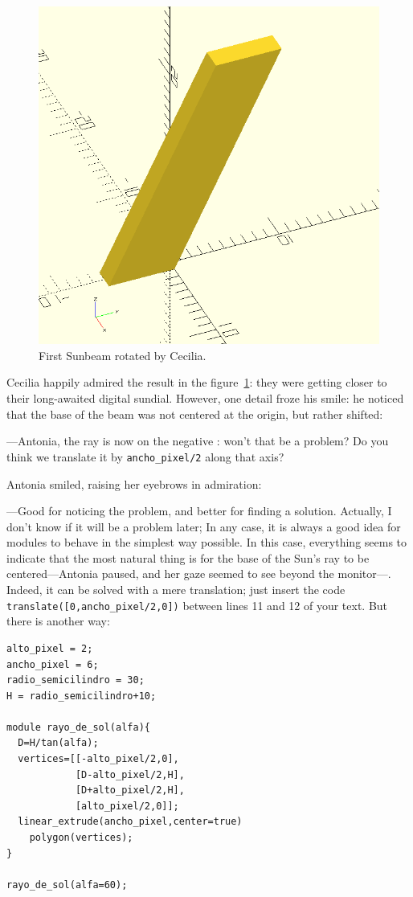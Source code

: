   \begin{figure}[t]
    \centering
  \includegraphics[width=.48\textwidth]{imagenes/rayo-extrudido-2}    
    \caption{First Sunbeam rotated by Cecilia.}
    \label{fig:rayo-extrudido-2}
  \end{figure}

Cecilia happily admired the result in the figure~\ref{fig:rayo-extrudido-2}: they were getting closer to their long-awaited digital sundial. However, one detail froze his smile: he noticed that the base of the beam was not centered at the origin, but rather shifted:

---Antonia, the ray is now on the negative  : won't that be a problem? Do you think we translate it by   \texttt{ancho\_pixel/2} along that axis?

Antonia smiled, raising her eyebrows in admiration:

---Good for noticing the problem, and better for finding a solution. Actually, I don't know if it will be a problem later; In any case, it is always a good idea for modules to behave in the simplest way possible. In this case, everything seems to indicate that the most natural thing is for the base of the Sun's ray to be centered---Antonia paused, and her gaze seemed to see beyond the monitor---.
Indeed, it can be solved with a mere translation; just insert the code \lstinline!translate([0,ancho_pixel/2,0])! between lines 11 and 12 of your text. But there is another way:

\begin{lstlisting}
alto_pixel = 2;
ancho_pixel = 6;
radio_semicilindro = 30;
H = radio_semicilindro+10;

module rayo_de_sol(alfa){
  D=H/tan(alfa);
  vertices=[[-alto_pixel/2,0],
            [D-alto_pixel/2,H],
            [D+alto_pixel/2,H],
            [alto_pixel/2,0]];
  linear_extrude(ancho_pixel,center=true)
    polygon(vertices);
}
 
rayo_de_sol(alfa=60);
\end{lstlisting}

